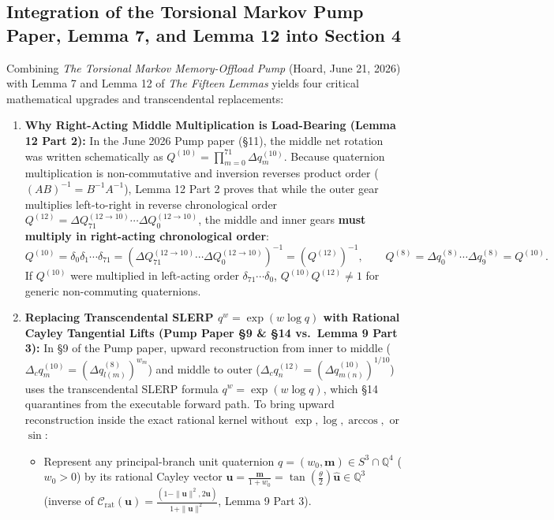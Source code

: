 \documentclass[11pt, a4paper]{article}
\begin{document}
\subsection{Integration of the Torsional Markov Pump Paper, Lemma 7, and Lemma 12 into Section 4}
Combining \textit{The Torsional Markov Memory-Offload Pump} (Hoard, June 21, 2026) with Lemma 7 and Lemma 12 of \textit{The Fifteen Lemmas} yields four critical mathematical upgrades and transcendental replacements:
\begin{enumerate}
    \item \textbf{Why Right-Acting Middle Multiplication is Load-Bearing (Lemma 12 Part 2):}
    In the June 2026 Pump paper (§11), the middle net rotation was written schematically as $Q^{(10)} = \prod_{m=0}^{71} \Delta q_m^{(10)}$. Because quaternion multiplication is non-commutative and inversion reverses product order ($(AB)^{-1} = B^{-1}A^{-1}$), Lemma 12 Part 2 proves that while the outer gear multiplies left-to-right in reverse chronological order $Q^{(12)} = \Delta Q_{71}^{(12\to 10)} \cdots \Delta Q_0^{(12\to 10)}$, the middle and inner gears \textbf{must multiply in right-acting chronological order}:
    \begin{equation}
    Q^{(10)} = \delta_0 \delta_1 \cdots \delta_{71} = \left(\Delta Q_{71}^{(12\to 10)} \cdots \Delta Q_0^{(12\to 10)}\right)^{-1} = \left(Q^{(12)}\right)^{-1}, \qquad Q^{(8)} = \Delta q_0^{(8)} \cdots \Delta q_9^{(8)} = Q^{(10)}.
    \end{equation}
    If $Q^{(10)}$ were multiplied in left-acting order $\delta_{71}\cdots\delta_0$, $Q^{(10)}Q^{(12)} \neq 1$ for generic non-commuting quaternions.
    \item \textbf{Replacing Transcendental SLERP $q^w = \exp(w\log q)$ with Rational Cayley Tangential Lifts (Pump Paper §9 \& §14 vs.\ Lemma 9 Part 3):}
    In §9 of the Pump paper, upward reconstruction from inner to middle ($\Delta_c q_m^{(10)} = (\Delta q_{l(m)}^{(8)})^{w_m}$) and middle to outer ($\Delta_c q_n^{(12)} = (\Delta q_{m(n)}^{(10)})^{1/10}$) uses the transcendental SLERP formula $q^w = \exp(w\log q)$, which §14 quarantines from the executable forward path. To bring upward reconstruction inside the exact rational kernel without $\exp, \log, \arccos,$ or $\sin$:
    \begin{itemize}
        \item Represent any principal-branch unit quaternion $q = (w_0, \mathbf{m}) \in S^3 \cap \mathbb{Q}^4$ ($w_0 > 0$) by its rational Cayley vector $\mathbf{u} = \frac{\mathbf{m}}{1 + w_0} = \tan\!\left(\frac{\theta}{2}\right)\hat{\mathbf{u}} \in \mathbb{Q}^3$ (inverse of $\mathcal{C}_{\text{rat}}(\mathbf{u}) = \frac{(1-\|\mathbf{u}\|^2, 2\mathbf{u})}{1+\|\mathbf{u}\|^2}$, Lemma 9 Part 3).

\end{itemize}
\end{enumerate}
\end{document}
